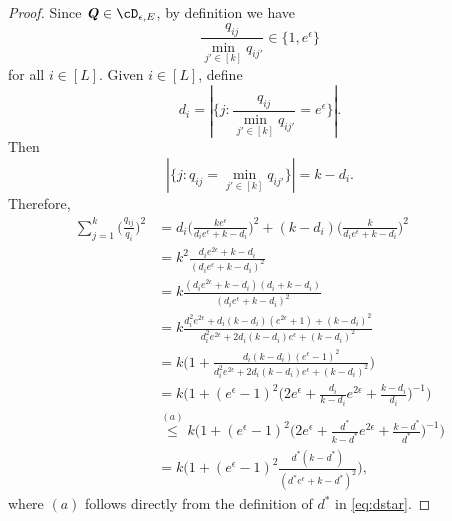\documentclass[11pt,onecolumn]{IEEEtran}
\def\mathbi#1{{\textbf{\textit #1}}}
\begin{document}
\begin{proof}
Since $\mathbi{Q}\in \cD_{\epsilon,E}$, by definition we have 
$$
\frac{q_{ij}}{\min_{j'\in[k]}q_{ij'}} \in \{1, e^{\epsilon}\}
$$
for all $i\in[L]$. Given $i\in[L]$, define
$$
d_i = |\{j:\frac{q_{ij}}{\min_{j'\in[k]}q_{ij'}} = e^{\epsilon} \}|.
$$
Then
$$
|\{j: q_{ij} = \min_{j'\in[k]}q_{ij'}  \}| = k-d_i.
$$
Therefore, 
   \begin{align*}
\sum_{j=1}^{k} \big( \frac{q_{ij}}{q_i} \big)^2 
 & = d_i \big( \frac{k e^{\epsilon}}{d_i e^{\epsilon} + k - d_i} \big)^2
 + (k-d_i) \big( \frac{k }{d_i e^{\epsilon} + k - d_i} \big)^2  \\
 & = k^2 \frac{d_i e^{2\epsilon} + k - d_i}{(d_i e^{\epsilon} + k - d_i)^2} \\
 & =  k \frac{(d_i e^{2\epsilon} + k - d_i) (d_i+k-d_i) }{(d_i e^{\epsilon} + k - d_i)^2} \\
 & = k \frac{ d_i^2 e^{2\epsilon} + d_i(k-d_i)(e^{2\epsilon}+1) + (k-d_i)^2 }
{ d_i^2 e^{2\epsilon} + 2d_i(k-d_i)e^{\epsilon} + (k-d_i)^2 }  \\
 & = k \Big( 1 + \frac{  d_i(k-d_i)(e^{\epsilon} - 1)^2  }
{ d_i^2 e^{2\epsilon} + 2d_i(k-d_i)e^{\epsilon} + (k-d_i)^2 }  \Big) \\
 & = k \Big( 1 +   (e^{\epsilon} - 1)^2  
 \Big( 2e^{\epsilon} + \frac{d_i}{k-d_i} e^{2\epsilon}  + \frac{k-d_i}{d_i} \Big)^{-1}  \Big) \\
 & \overset{(a)}{\le} k \Big( 1 +   (e^{\epsilon} - 1)^2  
 \Big( 2e^{\epsilon} + \frac{d^\ast}{k-d^\ast} e^{2\epsilon}  + \frac{k-d^\ast}{d^\ast} \Big)^{-1}  \Big) \\
 & = k \Big( 1 +   (e^{\epsilon} - 1)^2  
 \frac{d^\ast (k-d^\ast)} {(d^\ast e^{\epsilon} + k - d^\ast)^2}  \Big)  ,
    \end{align*}
where $(a)$ follows directly from the definition of $d^\ast$ in \eqref{eq:dstar}.
\end{proof}
\end{document}
